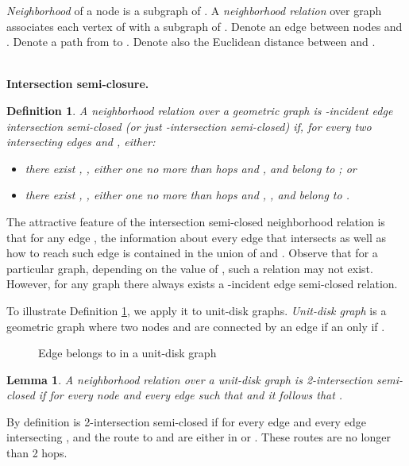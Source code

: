 \documentclass[conference]{IEEEtran}
\newtheorem{definition}{Definition}
\newtheorem{lemma}{Lemma}
\def\Proof{\par\noindent{\bf Proof:}\indent}
\def\PROG#1{}
\begin{document}
\emph{Neighborhood}  of a node  is a subgraph of . A
\emph{neighborhood relation} \PROG{N} over graph  associates
each vertex of  with a subgraph of .  Denote  an
edge between nodes  and . Denote  a path from  to
. Denote also  the Euclidean distance between  and .




\ \\ \noindent
\textbf{Intersection semi-closure.}

\begin{definition} \label{DefSemiclosure}
A neighborhood relation \PROG{N} over a geometric graph  is
\emph{-incident edge intersection semi-closed} (or just
\emph{-intersection semi-closed}) if, for every two intersecting
edges  and , either:
\begin{itemize}
\item there exist , , either one no more than
 hops and ,  and  belong to ; or
\item there exist , , either one no more than
 hops and , , and  belong to .
\end{itemize}

\end{definition}

The attractive feature of the intersection semi-closed neighborhood
relation is that for any edge , the information about every
edge that intersects  as well as how to reach such edge is
contained in the union of  and . Observe that for a
particular graph, depending on the value of , such a relation
may not exist. However, for any graph there always exists
a -incident edge semi-closed relation.

To illustrate Definition \ref{DefSemiclosure}, we apply it to
unit-disk graphs.  \emph{Unit-disk graph} is a geometric graph where
two nodes  and  are connected by an edge if an only if .

\begin{figure} 
\center
{} 
\caption{Edge  belongs to  in a unit-disk graph}
\label{FigUdisk} 
\end{figure}

\begin{lemma}\label{UDiskNeighborhood}
A neighborhood relation over a unit-disk graph is 2-intersection
semi-closed if for every node  and every edge  such that
 and  it follows that .
\end{lemma}

\Proof By definition \PROG{N} is 2-intersection semi-closed if
for every edge  and every edge  intersecting ,
and the route to  and  are either in  or . These
routes are no longer than 2 hops.
\end{document}
